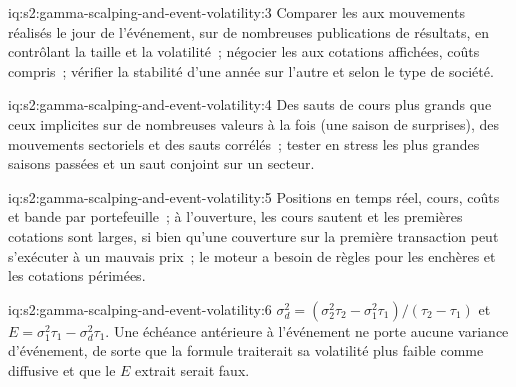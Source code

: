 \begin{solution}{iq:s2:gamma-scalping-and-event-volatility:3}
Comparer les  aux mouvements réalisés le jour de l'événement, sur de nombreuses publications de résultats, en contrôlant la taille et la volatilité~;
négocier les  aux cotations affichées, coûts compris~; vérifier la stabilité d'une année sur l'autre et selon le type de société.
\end{solution}

\begin{solution}{iq:s2:gamma-scalping-and-event-volatility:4}
Des sauts de cours plus grands que ceux implicites sur de nombreuses valeurs à la fois (une saison de surprises), des mouvements sectoriels et des sauts corrélés~; tester en stress
les plus grandes saisons passées et un saut conjoint sur un secteur.
\end{solution}

\begin{solution}{iq:s2:gamma-scalping-and-event-volatility:5}
Positions en temps réel, cours, coûts et bande par portefeuille~; à l'ouverture, les cours sautent et les premières cotations sont larges, si bien qu'une couverture sur la première transaction peut
s'exécuter à un mauvais prix~; le moteur a besoin de règles pour les enchères et les cotations périmées.
\end{solution}

\begin{solution}{iq:s2:gamma-scalping-and-event-volatility:6}
$\sigma_d^2 = (\sigma_2^2\tau_2 - \sigma_1^2\tau_1)/(\tau_2 - \tau_1)$ et $E = \sigma_1^2\tau_1 - \sigma_d^2\tau_1$. Une échéance antérieure à l'événement
ne porte aucune variance d'événement, de sorte que la formule traiterait sa volatilité plus faible comme diffusive et que le $E$ extrait serait faux.
\end{solution}
